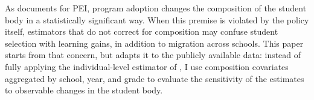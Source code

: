 As \textcite{favaro_composicao_pei} documents for PEI, program adoption changes the composition of the student body in a statistically significant way. When this premise is violated by the policy itself, estimators that do not correct for composition may confuse student selection with learning gains, in addition to migration across schools. This paper starts from that concern, but adapts it to the publicly available data: instead of fully applying the individual-level estimator of \textcite{santannaxu}, I use composition covariates aggregated by school, year, and grade to evaluate the sensitivity of the estimates to observable changes in the student body.
